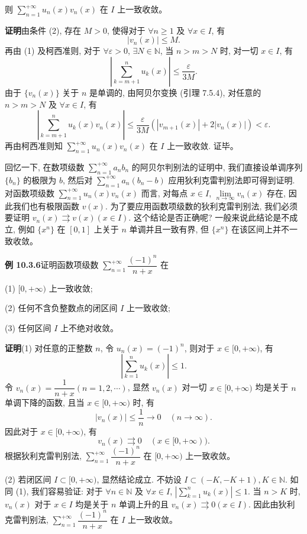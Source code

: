 \documentclass[UTF8,12pt,a4paper,fontset=fandol]{ctexart}
\begin{document}
则 $\sum\limits_{n=1}^{+\infty}u_n(x)v_n(x)$ 在 $I$ 上一致收敛。

\noindent\textbf{证明}\quad 由条件 (2), 存在 $M>0$, 使得对于 $\forall n\geq1$ 及 $\forall x\in I$, 有
\[
  |v_n(x)|\leq M.
\]
再由 (1) 及柯西准则, 对于 $\forall\varepsilon>0$, $\exists N\in\mathbb N$, 当 $n>m>N$ 时, 对一切 $x\in I$, 有
\[
  \left|\sum_{k=m+1}^n u_k(x)\right|\leq\frac{\varepsilon}{3M}.
\]
由于 $\{v_n(x)\}$ 关于 $n$ 是单调的, 由阿贝尔变换 (引理 7.5.4), 对任意的 $n>m>N$ 及 $\forall x\in I$, 有
\[
  \left|\sum_{k=m+1}^n u_k(x)v_n(x)\right|
  \leq\frac{\varepsilon}{3M}(|v_{m+1}(x)|+2|v_n(x)|)<\varepsilon.
\]
再由柯西准则知 $\sum\limits_{n=1}^{+\infty}u_n(x)v_n(x)$ 在 $I$ 上一致收敛. 证毕。

回忆一下, 在数项级数 $\sum\limits_{n=1}^{+\infty}a_nb_n$ 的阿贝尔判别法的证明中, 我们直接设单调序列 $\{b_n\}$ 的极限为 $b$, 然后对 $\sum\limits_{n=1}^{+\infty}a_n(b_n-b)$ 应用狄利克雷判别法即可得到证明. 对函数项级数 $\sum\limits_{n=1}^{+\infty}u_n(x)v_n(x)$ 而言, 对每点 $x\in I$, $\lim\limits_{n\to\infty}v_n(x)$ 存在, 因此我们也有极限函数 $v(x)$. 为了要应用函数项级数的狄利克雷判别法, 我们必须要证明 $v_n(x)\rightrightarrows v(x)(x\in I)$. 这个结论是否正确呢? 一般来说此结论是不成立, 例如 $\{x^n\}$ 在 $[0,1]$ 上关于 $n$ 单调并且一致有界, 但 $\{x^n\}$ 在该区间上并不一致收敛。

\noindent\textbf{例 10.3.6}\quad 证明函数项级数 $\sum\limits_{n=1}^{+\infty}\dfrac{(-1)^n}{n+x}$ 在

(1) $[0,+\infty)$ 上一致收敛;

(2) 任何不含负整数点的闭区间 $I$ 上一致收敛;

(3) 任何区间 $I$ 上不绝对收敛。

\noindent\textbf{证明}\quad (1) 对任意的正整数 $n$, 令 $u_n(x)=(-1)^n$, 则对于 $x\in[0,+\infty)$, 有
\[
  \left|\sum_{k=1}^n u_k(x)\right|\leq1.
\]
令 $v_n(x)=\dfrac1{n+x}(n=1,2,\cdots)$, 显然 $v_n(x)$ 对一切 $x\in[0,+\infty)$ 均是关于 $n$ 单调下降的函数, 且当 $x\in[0,+\infty)$ 时, 有
\[
  |v_n(x)|\leq\frac1n\to0\quad(n\to\infty).
\]
因此对于 $x\in[0,+\infty)$, 有
\[
  v_n(x)\rightrightarrows0\quad(x\in[0,+\infty)).
\]
根据狄利克雷判别法, $\sum\limits_{n=1}^{+\infty}\dfrac{(-1)^n}{n+x}$ 在 $[0,+\infty)$ 上一致收敛。

(2) 若闭区间 $I\subset[0,+\infty)$, 显然结论成立. 不妨设 $I\subset(-K,-K+1), K\in\mathbb N$. 如同 (1), 我们容易验证: 对于 $\forall n\in\mathbb N$ 及 $\forall x\in I$, $\left|\sum\limits_{k=1}^n u_k(x)\right|\leq1$. 当 $n>K$ 时, $v_n(x)$ 对于 $x\in I$ 均是关于 $n$ 单调上升的且 $v_n(x)\rightrightarrows0(x\in I)$. 因此由狄利克雷判别法, $\sum\limits_{n=1}^{+\infty}\dfrac{(-1)^n}{n+x}$ 在 $I$ 上一致收敛。
\end{document}
